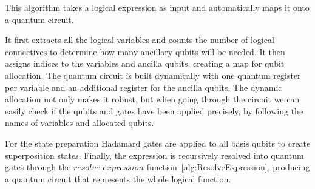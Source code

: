 \documentclass[encoding=utf8,british]{tumphthesis}
\begin{document}
    This algorithm takes a logical expression as input and automatically maps it onto a quantum circuit. 
    
    It first extracts all the logical variables 
    and counts the number of logical connectives to determine how many ancillary qubits will be needed. It then assigns indices to the variables and 
    ancilla qubits, creating a map for qubit allocation. The quantum circuit is built dynamically with one quantum register per variable and an 
    additional register for the ancilla qubits. The dynamic allocation not only makes it robust, but when going through the circuit we can easily check 
    if the qubits and gates have been applied precisely, by following the names of variables and allocated qubits. 
    
    For the state preparation Hadamard gates are applied to all basis qubits to create superposition states. Finally, the expression is recursively 
    resolved into quantum gates through the $resolve \_ expression$ function~\ref{alg:ResolveExpression}, producing a quantum circuit that represents the whole logical function. 
\end{document}
